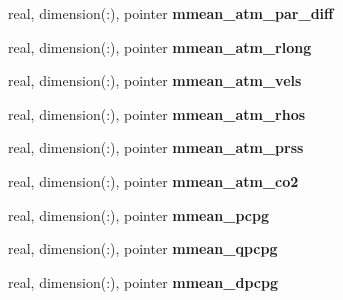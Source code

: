 \begin{DoxyCompactItemize}
\item 
\hypertarget{structed__state__vars_1_1edtype_a7804cd3246fb998e0a17c5186ab1f77f}{
real, dimension(:), pointer {\bfseries mmean\_\-atm\_\-par\_\-diff}}
\label{structed__state__vars_1_1edtype_a7804cd3246fb998e0a17c5186ab1f77f}

\item 
\hypertarget{structed__state__vars_1_1edtype_ae3dfd889166bc899538ac83a0069baf9}{
real, dimension(:), pointer {\bfseries mmean\_\-atm\_\-rlong}}
\label{structed__state__vars_1_1edtype_ae3dfd889166bc899538ac83a0069baf9}

\item 
\hypertarget{structed__state__vars_1_1edtype_ab6805a663e99d2e9c87ada2e10b4998a}{
real, dimension(:), pointer {\bfseries mmean\_\-atm\_\-vels}}
\label{structed__state__vars_1_1edtype_ab6805a663e99d2e9c87ada2e10b4998a}

\item 
\hypertarget{structed__state__vars_1_1edtype_aa4f6d1149e2445f4dd6a0f891e5d36d8}{
real, dimension(:), pointer {\bfseries mmean\_\-atm\_\-rhos}}
\label{structed__state__vars_1_1edtype_aa4f6d1149e2445f4dd6a0f891e5d36d8}

\item 
\hypertarget{structed__state__vars_1_1edtype_a322e984347eac1236c38561da15541d2}{
real, dimension(:), pointer {\bfseries mmean\_\-atm\_\-prss}}
\label{structed__state__vars_1_1edtype_a322e984347eac1236c38561da15541d2}

\item 
\hypertarget{structed__state__vars_1_1edtype_a8773fa5dceb14c13f8d51890f29dc4b8}{
real, dimension(:), pointer {\bfseries mmean\_\-atm\_\-co2}}
\label{structed__state__vars_1_1edtype_a8773fa5dceb14c13f8d51890f29dc4b8}

\item 
\hypertarget{structed__state__vars_1_1edtype_a1483108fa53f5a7f370a6fffbcb8e4af}{
real, dimension(:), pointer {\bfseries mmean\_\-pcpg}}
\label{structed__state__vars_1_1edtype_a1483108fa53f5a7f370a6fffbcb8e4af}

\item 
\hypertarget{structed__state__vars_1_1edtype_a2de1acb1bb84215e7f580366d4ebc098}{
real, dimension(:), pointer {\bfseries mmean\_\-qpcpg}}
\label{structed__state__vars_1_1edtype_a2de1acb1bb84215e7f580366d4ebc098}

\item 
\hypertarget{structed__state__vars_1_1edtype_a37eee7bf185f5f3401051df11dee817a}{
real, dimension(:), pointer {\bfseries mmean\_\-dpcpg}}
\label{structed__state__vars_1_1edtype_a37eee7bf185f5f3401051df11dee817a}


\end{DoxyCompactItemize}
